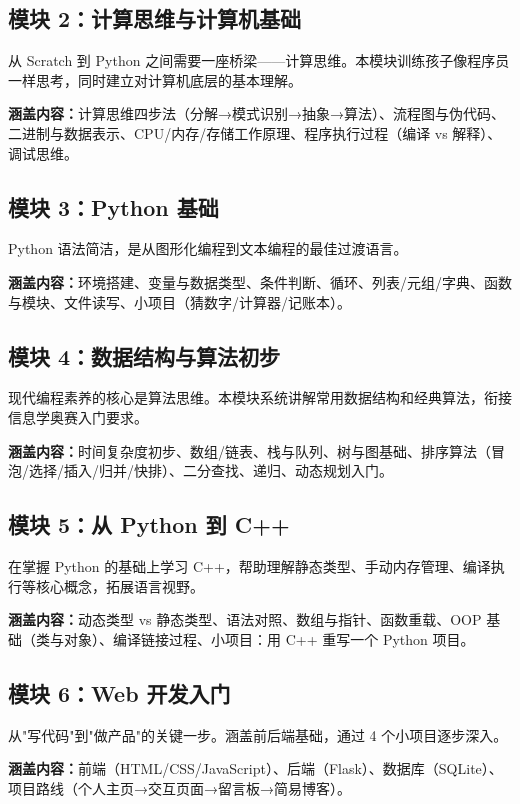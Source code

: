 \documentclass[a4paper,12pt]{ctexart}
\begin{document}
\subsection*{模块 2：计算思维与计算机基础}

从 Scratch 到 Python 之间需要一座桥梁——计算思维。本模块训练孩子像程序员一样思考，同时建立对计算机底层的基本理解。

\textbf{涵盖内容：}计算思维四步法（分解→模式识别→抽象→算法）、流程图与伪代码、二进制与数据表示、CPU/内存/存储工作原理、程序执行过程（编译 vs 解释）、调试思维。

\subsection*{模块 3：Python 基础}

Python 语法简洁，是从图形化编程到文本编程的最佳过渡语言。

\textbf{涵盖内容：}环境搭建、变量与数据类型、条件判断、循环、列表/元组/字典、函数与模块、文件读写、小项目（猜数字/计算器/记账本）。

\subsection*{模块 4：数据结构与算法初步}

现代编程素养的核心是算法思维。本模块系统讲解常用数据结构和经典算法，衔接信息学奥赛入门要求。

\textbf{涵盖内容：}时间复杂度初步、数组/链表、栈与队列、树与图基础、排序算法（冒泡/选择/插入/归并/快排）、二分查找、递归、动态规划入门。

\subsection*{模块 5：从 Python 到 C++}

在掌握 Python 的基础上学习 C++，帮助理解静态类型、手动内存管理、编译执行等核心概念，拓展语言视野。

\textbf{涵盖内容：}动态类型 vs 静态类型、语法对照、数组与指针、函数重载、OOP 基础（类与对象）、编译链接过程、小项目：用 C++ 重写一个 Python 项目。

\subsection*{模块 6：Web 开发入门}

从"写代码"到"做产品"的关键一步。涵盖前后端基础，通过 4 个小项目逐步深入。

\textbf{涵盖内容：}前端（HTML/CSS/JavaScript）、后端（Flask）、数据库（SQLite）、项目路线（个人主页→交互页面→留言板→简易博客）。
\end{document}
